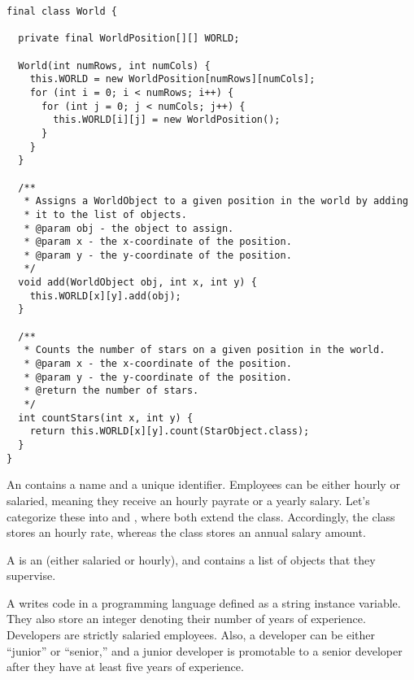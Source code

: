 \begin{lstlisting}[language=MyJava]
final class World {
  
  private final WorldPosition[][] WORLD;

  World(int numRows, int numCols) {
    this.WORLD = new WorldPosition[numRows][numCols];
    for (int i = 0; i < numRows; i++) {
      for (int j = 0; j < numCols; j++) {
        this.WORLD[i][j] = new WorldPosition();
      }
    }
  }

  /**
   * Assigns a WorldObject to a given position in the world by adding
   * it to the list of objects.
   * @param obj - the object to assign.
   * @param x - the x-coordinate of the position.
   * @param y - the y-coordinate of the position.
   */
  void add(WorldObject obj, int x, int y) {
    this.WORLD[x][y].add(obj);
  }

  /**
   * Counts the number of stars on a given position in the world.
   * @param x - the x-coordinate of the position.
   * @param y - the y-coordinate of the position.
   * @return the number of stars.
   */
  int countStars(int x, int y) {
    return this.WORLD[x][y].count(StarObject.class);
  }
}
\end{lstlisting}


An  contains a name and a unique identifier. Employees can be either hourly or salaried, meaning they receive an hourly payrate or a yearly salary. Let's categorize these into  and , where both extend the  class. Accordingly, the  class stores an hourly rate, whereas the  class stores an annual salary amount.

A  is an  (either salaried or hourly), and contains a list of  objects that they supervise. 

A  writes code in a programming language defined as a string instance variable. They also store an integer denoting their number of years of experience. Developers are strictly salaried employees. Also, a developer can be either ``junior'' or ``senior,'' and a junior developer is promotable to a senior developer after they have at least five years of experience.

